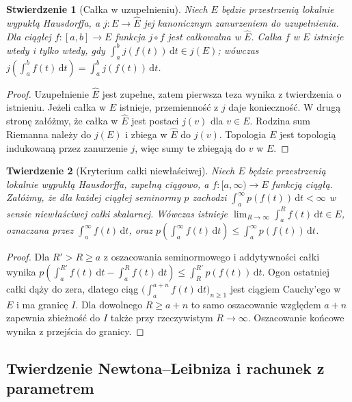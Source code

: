 \documentclass[11pt,a4paper]{article}
\numberwithin{equation}{section}
\theoremstyle{plain}
\newtheorem{twierdzenie}{Twierdzenie}[section]
\newtheorem{stwierdzenie}[twierdzenie]{Stwierdzenie}
\theoremstyle{definition}
\theoremstyle{remark}
\begin{document}
\begin{stwierdzenie}[Całka w uzupełnieniu]
\label{prop:completion-integral15a}
Niech $E$ będzie przestrzenią lokalnie wypukłą Hausdorffa, a
$j:E\to\widehat E$ jej kanonicznym zanurzeniem do uzupełnienia.
Dla ciągłej $f:[a,b]\to E$ funkcja $j\circ f$ jest
całkowalna w $\widehat E$. Całka $f$ w $E$ istnieje wtedy
i tylko wtedy, gdy $\int_a^b j(f(t))\,\mathrm dt\in j(E)$;
wówczas $j(\int_a^b f(t)\,\mathrm dt)
=\int_a^b j(f(t))\,\mathrm dt$.
\end{stwierdzenie}
\begin{proof}
Uzupełnienie $\widehat E$ jest zupełne, zatem pierwsza teza
wynika z twierdzenia o istnieniu. Jeżeli całka w $E$ istnieje,
przemienność z $j$ daje konieczność. W drugą stronę załóżmy,
że całka w $\widehat E$ jest postaci $j(v)$ dla $v\in E$.
Rodzina sum Riemanna należy do $j(E)$ i zbiega w $\widehat E$
do $j(v)$. Topologia $E$ jest topologią indukowaną przez
zanurzenie $j$, więc sumy te zbiegają do $v$ w $E$.
\end{proof}

\begin{twierdzenie}[Kryterium całki niewłaściwej]
\label{thm:improper-lcs15a}
Niech $E$ będzie przestrzenią lokalnie wypukłą Hausdorffa,
zupełną ciągowo, a $f:[a,\infty)\to E$ funkcją ciągłą.
Załóżmy, że dla każdej ciągłej seminormy $p$ zachodzi
$\int_a^\infty p(f(t))\,\mathrm dt<\infty$ w sensie
niewłaściwej całki skalarnej. Wówczas istnieje
$\lim_{R\to\infty}\int_a^R f(t)\,\mathrm dt\in E$, oznaczana przez
$\int_a^\infty f(t)\,\mathrm dt$, oraz
$p(\int_a^\infty f(t)\,\mathrm dt)
\le\int_a^\infty p(f(t))\,\mathrm dt$.
\end{twierdzenie}
\begin{proof}
Dla $R'>R\ge a$ z oszacowania seminormowego i addytywności
całki wynika
$p(\int_a^{R'}f(t)\,\mathrm dt-\int_a^R f(t)\,\mathrm dt)
\le\int_R^{R'}p(f(t))\,\mathrm dt$.
Ogon ostatniej całki dąży do zera, dlatego ciąg
$\bigl(\int_a^{a+n}f(t)\,\mathrm dt\bigr)_{n\ge1}$
jest ciągiem Cauchy'ego w $E$ i ma granicę $I$.
Dla dowolnego $R\ge a+n$ to samo oszacowanie względem
$a+n$ zapewnia zbieżność do $I$ także przy rzeczywistym
$R\to\infty$. Oszacowanie końcowe wynika z przejścia do granicy.
\end{proof}

\subsection{Twierdzenie Newtona--Leibniza i rachunek z parametrem}
\end{document}
